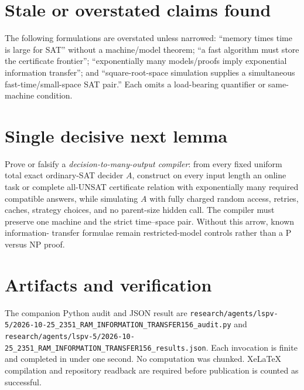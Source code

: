 \documentclass[11pt]{article}
\begin{document}
\section*{Stale or overstated claims found}
The following formulations are overstated unless narrowed: ``memory times time is
large for SAT'' without a machine/model theorem; ``a fast algorithm must store the
certificate frontier''; ``exponentially many models/proofs imply exponential
information transfer''; and ``square-root-space simulation supplies a simultaneous
fast-time/small-space SAT pair.''  Each omits a load-bearing quantifier or same-machine
condition.

\section*{Single decisive next lemma}
Prove or falsify a \emph{decision-to-many-output compiler}: from every fixed uniform
total exact ordinary-SAT decider $A$, construct on every input length an online task or
complete all-UNSAT certificate relation with exponentially many required compatible
answers, while simulating $A$ with fully charged random access, retries, caches,
strategy choices, and no parent-size hidden call.  The compiler must preserve one
machine and the strict time--space pair.  Without this arrow, known information-
transfer formulae remain restricted-model controls rather than a P versus NP proof.

\section*{Artifacts and verification}
The companion Python audit and JSON result are
\texttt{research/agents/lspv-5/2026-10-25\_2351\_RAM\_INFORMATION\_TRANSFER156\_audit.py}
and
\texttt{research/agents/lspv-5/2026-10-25\_2351\_RAM\_INFORMATION\_TRANSFER156\_results.json}.
Each invocation is finite and completed in under one second.  No computation was
chunked.  XeLaTeX compilation and repository readback are required before publication
is counted as successful.

\end{document}
